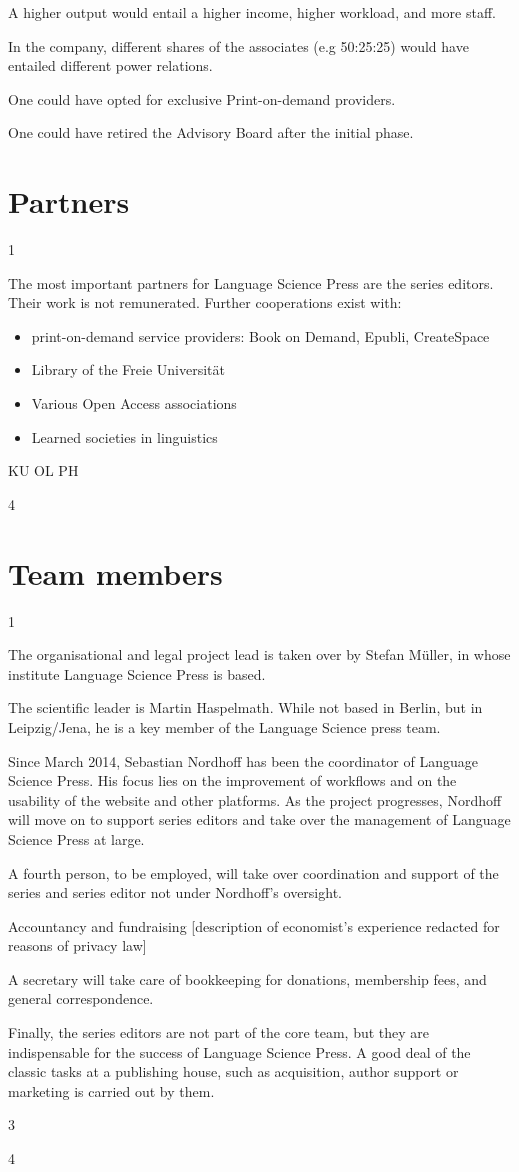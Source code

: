 \documentclass[output=guidelines,nonflat
]{langsci/langscibook}
\newcommand{\background}[1]{ 
  \vspace{5mm}
  \renewcommand{\tblslinecolour}{lsDarkBlue}
  \tblssy[red]{explore2}{Background}{#1}
}
\newcommand{\langscisolution}[1]{
  \renewcommand{\tblslinecolour}{lsLightBlue}
  \tblssy{langsci}{LangSci solution}{#1}
}
\newcommand{\evaluation}[1]{
  \renewcommand{\tblslinecolour}{lsLightOrange}
  \tblssy{receipt}{Evaluation}{#1}
}
\newcommand{\othersolutions}[1]{
  \renewcommand{\tblslinecolour}{lsDarkGreenOne}
  \tblssy{more}{Other solutions}{#1}
}
\renewcommand{\tblssy}[4][black!12]{%
  \renewcommand{\langscisymbol}{#2}\renewcommand{\tblsboxcolor}{#1}
  \begin{mdframed}[style=yellowexercise,frametitle={#3}]
    #4
  \end{mdframed}
}
\begin{document}
\othersolutions{A higher output would entail a higher income, higher workload, and more staff. 

In the company, different shares of the associates (e.g 50:25:25) would have entailed different power relations.

One could have opted for exclusive Print-on-demand providers. 

One could have retired the Advisory Board after the initial phase. 

}
 
\section{Partners}

\background{1}
\langscisolution{
The most important partners for Language Science Press are the series editors. Their work is not remunerated. Further cooperations exist with:
\begin{itemize}
 \item print-on-demand service providers: Book on Demand, Epubli, CreateSpace 
 \item Library of the Freie Universität 
 \item Various Open Access associations 
 \item Learned societies in linguistics
\end{itemize}
}
\evaluation{
KU
OL
PH
}
\othersolutions{4}
 

\section{Team members}

\background{1}
\langscisolution{
The organisational and legal project lead is taken over by Stefan Müller, in whose institute Language Science Press is based.

The scientific leader is Martin Haspelmath. While not based in Berlin, but in Leipzig/Jena, he is a key member of the Language Science press team.

Since March 2014, Sebastian Nordhoff has been the coordinator of Language Science Press. His focus lies on the improvement of workflows and on the usability of the website and other platforms. As the project progresses, Nordhoff will move on to support series editors and take over the management of Language Science Press at large.

A fourth person, to be employed, will take over coordination and support of the series and series editor not under Nordhoff's oversight. 

Accountancy and fundraising
[description of economist's experience redacted for reasons of  privacy law]

A secretary will take care of bookkeeping for donations, membership fees, and general correspondence.

Finally, the series editors are not part of the core team, but they are indispensable for the success of Language Science Press. A good deal of the classic tasks at a publishing house, such as acquisition, author support or marketing is carried out by them. 

}
\evaluation{3}
\othersolutions{4}
 
\end{document}
